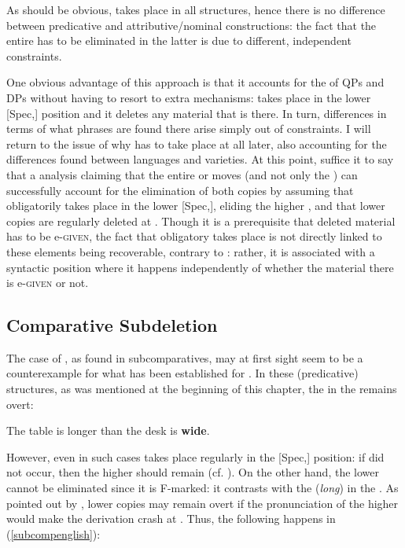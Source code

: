 As should be obvious,  takes place in all structures, hence there is no difference between predicative and attributive/nominal constructions: the fact that the entire  has to be eliminated in the latter is due to different, independent constraints.

One obvious advantage of this approach is that it accounts for the  of QPs and DPs without having to resort to extra mechanisms:  takes place in the lower [Spec,] position and it deletes any material that is there. In turn, differences in terms of what phrases are found there arise simply out of  constraints. I will return to the issue of why  has to take place at all later, also accounting for the differences found between languages and varieties. At this point, suffice it to say that a  analysis claiming that the entire  or  moves (and not only the ) can successfully account for the elimination of both copies by assuming that  obligatorily takes place in the lower [Spec,], eliding the higher , and that lower copies are regularly deleted at . Though it is a prerequisite that deleted material has to be e-\textsc{given}, the fact that obligatory  takes place is not directly linked to these elements being recoverable, contrary to \citet{kennedy2002}: rather, it is associated with a syntactic position where it happens independently of whether the material there is e-\textsc{given} or not.

\subsection{Comparative Subdeletion} \label{sec:3comparativesubdeletion}
The case of , as found in subcomparatives, may at first sight seem to be a counterexample for what has been established for . In these (predicative) structures, as was mentioned at the beginning of this chapter, the  in the  remains overt:

\ea	The table is longer than the desk is \textbf{wide}. \label{subcompenglish}
\z

However, even in such cases  takes place regularly in the [Spec,] position: if  did not occur, then the higher  should remain (cf. \citealt{bacskaiatkari2010even}). On the other hand, the lower  cannot be eliminated since it is F-marked: it contrasts with the  (\textit{long}) in the . As pointed out by \citet[48]{boskovicnunes2007}, lower copies may remain overt if the pronunciation of the higher  would make the derivation crash at . Thus, the following happens in (\ref{subcompenglish}):

